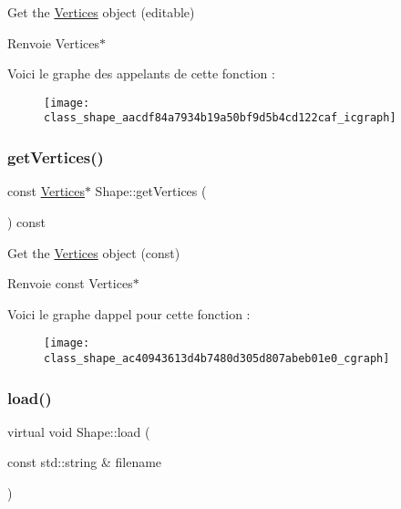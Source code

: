 Get the \hyperlink{struct_shape_1_1_vertices}{Vertices} object (editable) 

\begin{DoxyReturn}{Renvoie}
Vertices$\ast$ 
\end{DoxyReturn}
Voici le graphe des appelants de cette fonction \+:\nopagebreak
\begin{figure}[H]
\begin{center}
\leavevmode
\texttt{[image: class\_shape\_aacdf84a7934b19a50bf9d5b4cd122caf\_icgraph]}
\end{center}
\end{figure}
\mbox{\label{class_shape_ac40943613d4b7480d305d807abeb01e0}} 
\subsubsection{\texorpdfstring{get\+Vertices()}{getVertices()}\hspace{0.1cm}{\footnotesize\ttfamily [2/2]}}
{\footnotesize\ttfamily const \hyperlink{struct_shape_1_1_vertices}{Vertices}$\ast$ Shape\+::get\+Vertices (\begin{DoxyParamCaption}{ }\end{DoxyParamCaption}) const\hspace{0.3cm}{\ttfamily [inline]}}



Get the \hyperlink{struct_shape_1_1_vertices}{Vertices} object (const) 

\begin{DoxyReturn}{Renvoie}
const Vertices$\ast$ 
\end{DoxyReturn}
Voici le graphe d\textquotesingle{}appel pour cette fonction \+:\nopagebreak
\begin{figure}[H]
\begin{center}
\leavevmode
\texttt{[image: class\_shape\_ac40943613d4b7480d305d807abeb01e0\_cgraph]}
\end{center}
\end{figure}
\mbox{\label{class_shape_a20d654ec232b682c36cd8b28d2cba750}} 
\subsubsection{\texorpdfstring{load()}{load()}}
{\footnotesize\ttfamily virtual void Shape\+::load (\begin{DoxyParamCaption}\item[{const std\+::string \&}]{filename }\end{DoxyParamCaption})\hspace{0.3cm}{\ttfamily [pure virtual]}}



